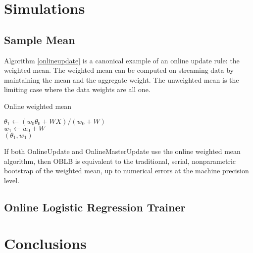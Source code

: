 \documentclass{article}
\begin{document}
\section{Simulations}

\subsection{Sample Mean}

Algorithm \ref{onlineupdate} is a canonical example of an online update rule: the weighted mean. 
The weighted mean can be computed on streaming data by maintaining the mean and the aggregate
weight. The unweighted mean is the limiting case where the data weights are all one.

\begin{algorithm}
\caption{Online weighted mean}
\label{onlineupdate}
\DontPrintSemicolon
{}
$\theta_1 \gets (w_0\theta_0 + WX)/(w_0 + W)$
\\
$w_1 \gets w_0 + W$ 
\\
\Return $(\theta_1, w_1)$
\end{algorithm}

If both OnlineUpdate and OnlineMasterUpdate use the online weighted mean algorithm, 
then OBLB is equivalent to the traditional, serial, nonparametric 
bootstrap of the weighted mean, up to numerical errors at the machine precision
level.

\subsection{Online Logistic Regression Trainer}


\section{Conclusions}





{}

\end{document}

